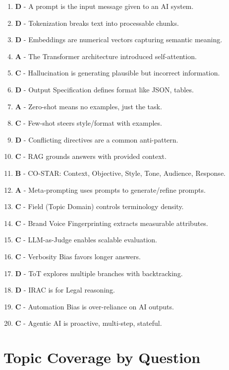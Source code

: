 \documentclass[11pt]{article}
\begin{document}
\begin{enumerate}
    \item \textbf{D} - A prompt is the input message given to an AI system.
    \item \textbf{D} - Tokenization breaks text into processable chunks.
    \item \textbf{D} - Embeddings are numerical vectors capturing semantic meaning.
    \item \textbf{A} - The Transformer architecture introduced self-attention.
    \item \textbf{C} - Hallucination is generating plausible but incorrect information.
    \item \textbf{D} - Output Specification defines format like JSON, tables.
    \item \textbf{A} - Zero-shot means no examples, just the task.
    \item \textbf{C} - Few-shot steers style/format with examples.
    \item \textbf{D} - Conflicting directives are a common anti-pattern.
    \item \textbf{C} - RAG grounds answers with provided context.
    \item \textbf{B} - CO-STAR: Context, Objective, Style, Tone, Audience, Response.
    \item \textbf{A} - Meta-prompting uses prompts to generate/refine prompts.
    \item \textbf{C} - Field (Topic Domain) controls terminology density.
    \item \textbf{C} - Brand Voice Fingerprinting extracts measurable attributes.
    \item \textbf{C} - LLM-as-Judge enables scalable evaluation.
    \item \textbf{C} - Verbosity Bias favors longer answers.
    \item \textbf{D} - ToT explores multiple branches with backtracking.
    \item \textbf{D} - IRAC is for Legal reasoning.
    \item \textbf{C} - Automation Bias is over-reliance on AI outputs.
    \item \textbf{C} - Agentic AI is proactive, multi-step, stateful.
\end{enumerate}

\vspace{1cm}

\section*{Topic Coverage by Question}
\end{document}
